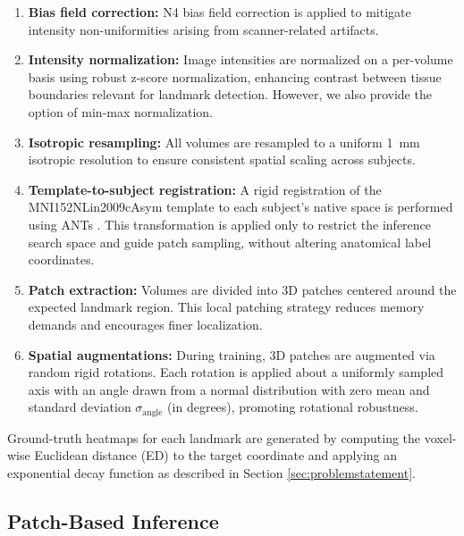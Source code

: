 \begin{enumerate}
    \item \textbf{Bias field correction:} N4 bias field correction \cite{Tustison2010-nw} is applied to mitigate intensity non-uniformities arising from scanner-related artifacts.
    
    \item \textbf{Intensity normalization:} Image intensities are normalized on a per-volume basis using robust z-score normalization, enhancing contrast between tissue boundaries relevant for landmark detection. However, we also provide the option of min-max normalization.
    
    \item \textbf{Isotropic resampling:} All volumes are resampled to a uniform 1~mm isotropic resolution to ensure consistent spatial scaling across subjects.
    
    \item \textbf{Template-to-subject registration:} A rigid registration of the MNI152NLin2009cAsym template to each subject’s native space is performed using ANTs \cite{Avants2011-zs}. This transformation is applied only to restrict the inference search space and guide patch sampling, without altering anatomical label coordinates.
    
    \item \textbf{Patch extraction:} Volumes are divided into 3D patches centered around the expected landmark region. This local patching strategy reduces memory demands and encourages finer localization.
    
    \item \textbf{Spatial augmentations:} During training, 3D patches are augmented via random rigid rotations. Each rotation is applied about a uniformly sampled axis with an angle drawn from a normal distribution with zero mean and standard deviation $\sigma_{\text{angle}}$ (in degrees), promoting rotational robustness.
\end{enumerate}

Ground-truth heatmaps for each landmark are generated by computing the voxel-wise Euclidean distance (ED) to the target coordinate and applying an exponential decay function as described in Section \ref{sec:problemstatement}.

\subsection{Patch-Based Inference}

